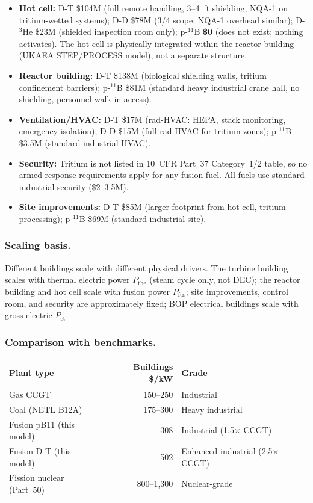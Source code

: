 \documentclass{article}
\begin{document}
\begin{itemize}
\item \textbf{Hot cell:} D-T \$104M (full remote handling, 3--4~ft
  shielding, NQA-1 on tritium-wetted systems); D-D \$78M (3/4 scope,
  NQA-1 overhead similar); D-${}^3$He \$23M (shielded inspection room
  only); p-${}^{11}$B \textbf{\$0} (does not exist; nothing
  activates).  The hot cell is physically integrated within the
  reactor building (UKAEA STEP/PROCESS model), not a separate
  structure.

\item \textbf{Reactor building:} D-T \$138M (biological shielding
  walls, tritium confinement barriers); p-${}^{11}$B \$81M (standard
  heavy industrial crane hall, no shielding, personnel walk-in access).

\item \textbf{Ventilation/HVAC:} D-T \$17M (rad-HVAC: HEPA, stack
  monitoring, emergency isolation); D-D \$15M (full rad-HVAC for
  tritium zones); p-${}^{11}$B \$3.5M (standard industrial HVAC).

\item \textbf{Security:} Tritium is not listed in 10~CFR Part~37
  Category~1/2 table, so no armed response requirements apply for any fusion
  fuel.  All fuels use standard industrial security (\$2--3.5M).

\item \textbf{Site improvements:} D-T \$85M (larger footprint from
  hot cell, tritium processing); p-${}^{11}$B \$69M (standard industrial site).
\end{itemize}

\subsubsection{Scaling basis.}
Different buildings scale with different physical drivers.  The
turbine building scales with thermal electric power $P_{\text{the}}$
(steam cycle only, not DEC); the reactor building and hot cell scale
with fusion power $P_{\text{fus}}$; site improvements, control room,
and security are approximately fixed; BOP electrical buildings scale
with gross electric $P_{\text{et}}$.

\subsubsection{Comparison with benchmarks.}
\begin{center}
\begin{tabular}{lrl}
\toprule
Plant type & Buildings \$/kW & Grade \\
\midrule
Gas CCGT & 150--250 & Industrial \\
Coal (NETL B12A) & 175--300 & Heavy industrial \\
Fusion pB11 (this model) & 308 & Industrial (1.5$\times$ CCGT) \\
Fusion D-T (this model) & 502 & Enhanced industrial (2.5$\times$ CCGT) \\
Fission nuclear (Part~50) & 800--1{,}300 & Nuclear-grade \\
\bottomrule
\end{tabular}
\end{center}
\end{document}
